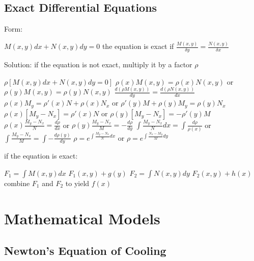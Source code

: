 \documentclass[12 pt, oneside]{book}
\begin{document}
\section{Exact Differential Equations}
Form:
\begin{mathline}
$M(x,y)dx + N(x,y)dy = 0$\newline{}
  the equation is exact if $\frac{M(x,y)}{\delta y}=\frac{N(x,y)}{\delta x}$
\end{mathline}
Solution:\newline{}
\indent if the equation is not exact, multiply it by a factor $\rho$
\begin{mathline}
  $\rho[M(x,y)dx + N(x,y)dy = 0]$\newline{}
  $\rho(x) M(x,y) = \rho(x) N(x,y)$ or $\rho(y) M(x,y) = \rho(y) N(x,y)$\newline{}  
  $\frac{d (\rho M(x,y))}{dy} = \frac{d(\rho N(x,y))}{dx}$\newline{}
  $\rho(x) M_y = \rho'(x)N +\rho(x)N_x$ or $\rho'(y)M + \rho(y)M_y = \rho(y) N_x$\newline{}
  $\rho(x)[M_y-N_x]=\rho'(x)N$ or $\rho(y)[M_y-N_x]=-\rho'(y)M$\newline{}
  $\rho(x)\frac{M_y-N_x}{N}=\frac{d\rho}{dx}$ or $\rho(y)\frac{M_y-N_x}{M}=-\frac{d\rho}{dy}$\newline{}
  $\int \frac{M_y-N_x}{N} dx = \int \frac{d\rho}{\rho(x)}$ or $\int \frac{M_y-N_x}{M} = \int -\frac{d\rho(y)}{dy}$\newline{}
  $\rho=e^{\int\frac{M_y-N_x}{N}dx}$ or $\rho=e^{\int\frac{N_x-M_y}{M}dy}$
\end{mathline}
\indent \indent if the equation is exact:
\begin{mathline}
  $F_1=\int M(x,y)dx$\newline{}
  $F_1(x,y)+g(y)$\newline{}
  $F_2=\int N(x,y) dy$\newline{}
  $F_2(x,y)+h(x)$\newline{}
  combine $F_1$ and $F_2$ to yield $f(x)$
\end{mathline}

\chapter{Mathematical Models}

\section{Newton's Equation of Cooling}
\end{document}
